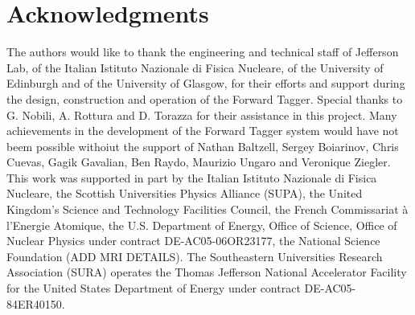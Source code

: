 \section*{Acknowledgments}

The authors would like to thank the engineering and technical staff of Jefferson Lab, of the Italian Istituto Nazionale di Fisica Nucleare, of the University of Edinburgh and of the University of Glasgow, for their efforts and support during the design, construction and operation of the Forward Tagger. Special thanks to G. Nobili, A. Rottura and D. Torazza for their assistance in this project. Many achievements in the development of the Forward Tagger system would have not beem possible withoiut the support of Nathan Baltzell, Sergey Boiarinov, Chris Cuevas, Gagik Gavalian, Ben Raydo, Maurizio Ungaro and Veronique Ziegler.  
This work was supported in part by the Italian Istituto Nazionale di Fisica Nucleare, the Scottish Universities Physics Alliance (SUPA), the United Kingdom's Science and Technology Facilities Council, the French Commissariat \`{a} l'Energie Atomique, the U.S. Department of Energy, Office of Science, Office of Nuclear Physics under contract DE-AC05-06OR23177, the National Science Foundation (ADD MRI DETAILS). The Southeastern Universities Research Association (SURA) operates the
 Thomas Jefferson National Accelerator Facility for the United States
 Department of Energy under contract DE-AC05-84ER40150.